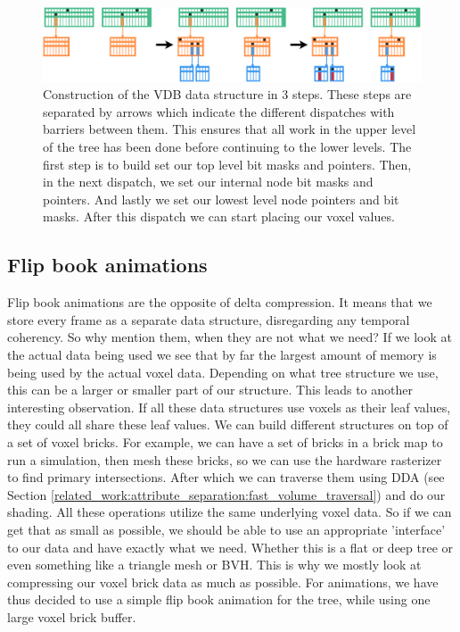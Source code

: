\begin{figure}[H]
    \centering
    \includegraphics[width=0.9\linewidth]{figures/VDB construction.png}
    \caption{Construction of the VDB data structure in 3 steps. These steps are separated by arrows which indicate the different dispatches with barriers between them. This ensures that all work in the upper level of the tree has been done before continuing to the lower levels. The first step is to build set our top level bit masks and pointers. Then, in the next dispatch, we set our internal node bit masks and pointers. And lastly we set our lowest level node pointers and bit masks. After this dispatch we can start placing our voxel values. }
    \label{fig:VDB_simulation_construction}
\end{figure}

\subsection{Flip book animations} \label{approach:flipbook_animations}
Flip book animations are the opposite of delta compression. It means that we store every frame as a separate data structure, disregarding any temporal coherency. So why mention them, when they are not what we need? If we look at the actual data being used we see that by far the largest amount of memory is being used by the actual voxel data. Depending on what tree structure we use, this can be a larger or smaller part of our structure. This leads to another interesting observation. If all these data structures use voxels as their leaf values, they could all share these leaf values. We can build different structures on top of a set of voxel bricks. For example, we can have a set of bricks in a brick map to run a simulation, then mesh these bricks, so we can use the hardware rasterizer to find primary intersections. After which we can traverse them using DDA (see Section \ref{related_work:attribute_separation:fast_volume_traversal}) and do our shading. All these operations utilize the same underlying voxel data. So if we can get that as small as possible, we should be able to use an appropriate 'interface' to our data and have exactly what we need. Whether this is a flat or deep tree or even something like a triangle mesh or BVH. This is why we mostly look at compressing our voxel brick data as much as possible. For animations, we have thus decided to use a simple flip book animation for the tree, while using one large voxel brick buffer.

